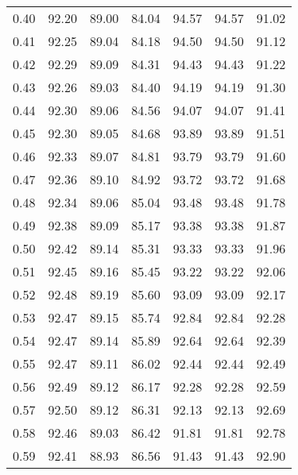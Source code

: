 \begin{tabular}{|c|c|c|c|c|c|c|}
      0.40 &     92.20 &     89.00 &      84.04 &   94.57 &      94.57 &         91.02 \\
      0.41 &     92.25 &     89.04 &      84.18 &   94.50 &      94.50 &         91.12 \\
      0.42 &     92.29 &     89.09 &      84.31 &   94.43 &      94.43 &         91.22 \\
      0.43 &     92.26 &     89.03 &      84.40 &   94.19 &      94.19 &         91.30 \\
      0.44 &     92.30 &     89.06 &      84.56 &   94.07 &      94.07 &         91.41 \\
      0.45 &     92.30 &     89.05 &      84.68 &   93.89 &      93.89 &         91.51 \\
      0.46 &     92.33 &     89.07 &      84.81 &   93.79 &      93.79 &         91.60 \\
      0.47 &     92.36 &     89.10 &      84.92 &   93.72 &      93.72 &         91.68 \\
      0.48 &     92.34 &     89.06 &      85.04 &   93.48 &      93.48 &         91.78 \\
      0.49 &     92.38 &     89.09 &      85.17 &   93.38 &      93.38 &         91.87 \\
      0.50 &     92.42 &     89.14 &      85.31 &   93.33 &      93.33 &         91.96 \\
      0.51 &     92.45 &     89.16 &      85.45 &   93.22 &      93.22 &         92.06 \\
      0.52 &     92.48 &     89.19 &      85.60 &   93.09 &      93.09 &         92.17 \\
      0.53 &     92.47 &     89.15 &      85.74 &   92.84 &      92.84 &         92.28 \\
      0.54 &     92.47 &     89.14 &      85.89 &   92.64 &      92.64 &         92.39 \\
      0.55 &     92.47 &     89.11 &      86.02 &   92.44 &      92.44 &         92.49 \\
      0.56 &     92.49 &     89.12 &      86.17 &   92.28 &      92.28 &         92.59 \\
      0.57 &     92.50 &     89.12 &      86.31 &   92.13 &      92.13 &         92.69 \\
      0.58 &     92.46 &     89.03 &      86.42 &   91.81 &      91.81 &         92.78 \\
      0.59 &     92.41 &     88.93 &      86.56 &   91.43 &      91.43 &         92.90 \\

\end{tabular}
